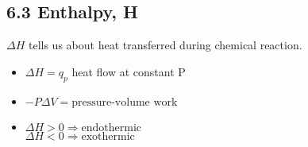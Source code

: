 \subsection{6.3 Enthalpy, H}
    $\Delta H$ tells us about heat transferred during chemical reaction.
    \begin{itemize}
        \itemsep0em
        \item $\Delta H = q_p$ heat flow at constant P
        \item $-P \Delta V = \text{pressure-volume work}$
        \item $\Delta H > 0 \Rightarrow \text{endothermic}$\\
              $\Delta H < 0 \Rightarrow \text{exothermic}$
    \end{itemize}